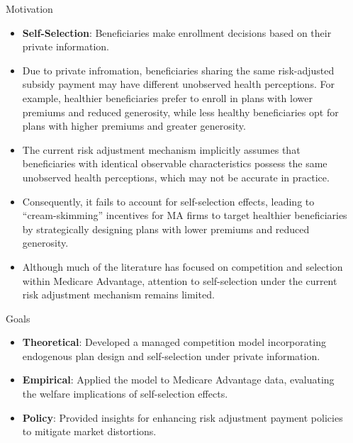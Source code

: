 \documentclass{beamer}
\begin{document}
\begin{frame}[t]
\begin{columns}[t]
\begin{column}{.25\textwidth}
      \begin{block}{Motivation}
        \begin{itemize}
            \item \textbf{Self-Selection}: Beneficiaries make enrollment decisions based on their private information.
            \item Due to private infromation, beneficiaries sharing the same risk-adjusted subsidy payment may have different unobserved health perceptions. For example, healthier beneficiaries prefer to enroll in plans with lower premiums and reduced generosity, while less healthy beneficiaries opt for plans with higher premiums and greater generosity.
            \item The current risk adjustment mechanism implicitly assumes that beneficiaries with identical observable characteristics possess the same unobserved health perceptions, which may not be accurate in practice.
            \item Consequently, it fails to account for self-selection effects, leading to ``cream-skimming'' incentives for MA firms to target healthier beneficiaries by strategically designing plans with lower premiums and reduced generosity.
            \item Although much of the literature has focused on competition and selection within Medicare Advantage, attention to self-selection under the current risk adjustment mechanism remains limited.
        \end{itemize}
      \end{block}
      \begin{block}{Goals}
        \begin{itemize}
          \item \textbf{Theoretical}: Developed a managed competition model incorporating endogenous plan design and self-selection under private information.
          \item \textbf{Empirical}: Applied the model to Medicare Advantage data, evaluating the welfare implications of self-selection effects.
          \item \textbf{Policy}: Provided insights for enhancing risk adjustment payment policies to mitigate market distortions.
        \end{itemize}
      \end{block}
    \end{column}
    \begin{column}{.3\textwidth}


\end{column}
\end{columns}
\end{frame}
\end{document}
